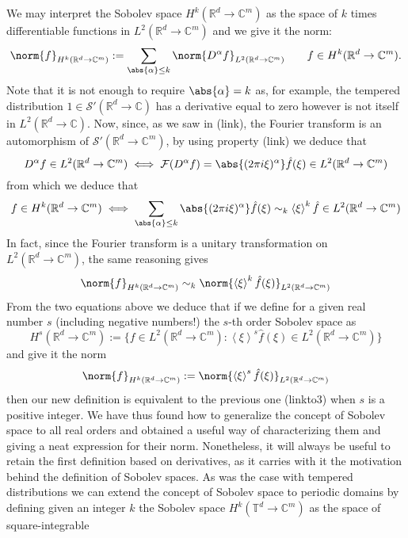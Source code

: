 \documentclass[
]{article}
\begin{document}
We may interpret the Sobolev space \(H^k({\mathbb R}^d\to\mathbb{C}^m)\)
as the space of \(k\) times differentiable functions in
\(L^2({\mathbb R}^d\to\mathbb{C}^m)\) and we give it the norm:
\[\norm{f}_{H^k({\mathbb R}^d\to\mathbb{C}^m)}:=\sum_{\abs{\alpha}\leq k}\norm{D^\alpha f}_{L^2({\mathbb R}^d\to\mathbb{C}^m)}\qquad f\in H^k({\mathbb R}^d\to\mathbb{C}^m).\]
Note that it is not enough to require \(\abs{\alpha}=k\) as, for
example, the tempered distribution
\(1 \in {\mathcal S}'({\mathbb R}^d\to\mathbb{C})\) has a derivative
equal to zero however is not itself in
\(L^2({\mathbb R}^d\to\mathbb{C})\). Now, since, as we saw in (link),
the Fourier transform is an automorphism of
\({\mathcal S}'({\mathbb R}^d\to\mathbb{C}^m)\), by using property
(link) we deduce that
\[D^\alpha f\in L^2({\mathbb R}^d\to\mathbb{C}^m)\iff \mathcal{F}(D^\alpha f)=\abs{(2\pi i\xi )^{\alpha}} \hat{f}(\xi)\in L^2({\mathbb R}^d\to\mathbb{C}^m)\]
from which we deduce that \[\label{sobolevcondition}
    f\in H^k({\mathbb R}^d\to\mathbb{C}^m)\iff \sum_{\abs{\alpha}\leq k} \abs{(2\pi i\xi )^{\alpha}}\hat{f}(\xi)\sim_k \left\langle\xi\right\rangle^k\hat{f}\in L^2({\mathbb R}^d\to\mathbb{C}^m)\]
In fact, since the Fourier transform is a unitary transformation on
\(L^2({\mathbb R}^d\to\mathbb{C}^m)\), the same reasoning gives
\[\label{sobolevnorm}
    \norm{f}_{H^k({\mathbb R}^d\to\mathbb{C}^m)}\sim_k \norm{\left\langle\xi\right\rangle^k\hat{f}(\xi)}_{L^2({\mathbb R}^d\to\mathbb{C}^m)}\]
From the two equations above we deduce that if we define for a given
real number \(s\) (including negative numbers!) the \(s\)-th order
Sobolev space as
\[H^s({\mathbb R}^d\to\mathbb{C}^m):=\lbrace f\in L^2({\mathbb R}^d\to\mathbb{C}^m): \left\langle\xi\right\rangle^s\hat{f}(\xi)\in L^2({\mathbb R}^d\to\mathbb{C}^m)\rbrace\]
and give it the norm
\[\norm{f}_{H^k({\mathbb R}^d\to\mathbb{C}^m)}:= \norm{\left\langle\xi\right\rangle^s\hat{f}(\xi)}_{L^2({\mathbb R}^d\to\mathbb{C}^m)}\]
then our new definition is equivalent to the previous one (linkto3) when
\(s\) is a positive integer. We have thus found how to generalize the
concept of Sobolev space to all real orders and obtained a useful way of
characterizing them and giving a neat expression for their norm.
Nonetheless, it will always be useful to retain the first definition
based on derivatives, as it carries with it the motivation behind the
definition of Sobolev spaces. As was the case with tempered
distributions we can extend the concept of Sobolev space to periodic
domains by defining given an integer \(k\) the Sobolev space
\(H^k({\mathbb T}^d\to\mathbb{C}^m)\) as the space of square-integrable
\end{document}
